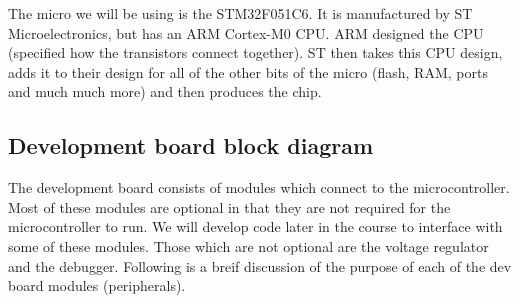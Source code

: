 \begin{table}
\caption{Comparison of specs of entry level computer to STM32F051C6.}
\label{table:specs_comp}
\end{table}

The micro we will be using is the STM32F051C6. It is manufactured by ST Microelectronics, but has an ARM Cortex-M0 CPU. ARM designed the CPU (specified how the transistors connect together). ST then takes this CPU design, adds it to their design for all of the other bits of the micro (flash, RAM, ports and much much more) and then produces the chip.

\subsection{Development board block diagram}
The development board consists of modules which connect to the microcontroller. Most of these modules are optional in that they are not required for the microcontroller to run. We will develop code later in the course to interface with some of these modules. Those which are not optional are the voltage regulator and the debugger.
Following is a breif discussion of the purpose of each of the dev board modules (peripherals).

